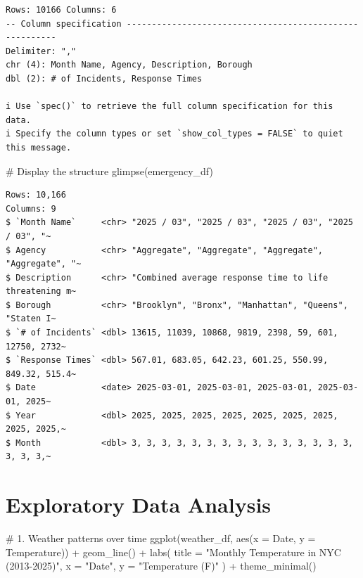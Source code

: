 \documentclass[
  letterpaper,
  DIV=11,
  numbers=noendperiod]{scrreprt}
\newenvironment{Shaded}{\begin{snugshade}}{\end{snugshade}}
\newcommand{\AttributeTok}[1]{\textcolor[rgb]{0.40,0.45,0.13}{#1}}
\newcommand{\CommentTok}[1]{\textcolor[rgb]{0.37,0.37,0.37}{#1}}
\newcommand{\FunctionTok}[1]{\textcolor[rgb]{0.28,0.35,0.67}{#1}}
\newcommand{\NormalTok}[1]{\textcolor[rgb]{0.00,0.23,0.31}{#1}}
\newcommand{\SpecialCharTok}[1]{\textcolor[rgb]{0.37,0.37,0.37}{#1}}
\newcommand{\StringTok}[1]{\textcolor[rgb]{0.13,0.47,0.30}{#1}}
\begin{document}
\begin{verbatim}
Rows: 10166 Columns: 6
-- Column specification --------------------------------------------------------
Delimiter: ","
chr (4): Month Name, Agency, Description, Borough
dbl (2): # of Incidents, Response Times

i Use `spec()` to retrieve the full column specification for this data.
i Specify the column types or set `show_col_types = FALSE` to quiet this message.
\end{verbatim}

\begin{Shaded}
\begin{Highlighting}[]
\CommentTok{\# Display the structure}
\FunctionTok{glimpse}\NormalTok{(emergency\_df)}
\end{Highlighting}
\end{Shaded}

\begin{verbatim}
Rows: 10,166
Columns: 9
$ `Month Name`     <chr> "2025 / 03", "2025 / 03", "2025 / 03", "2025 / 03", "~
$ Agency           <chr> "Aggregate", "Aggregate", "Aggregate", "Aggregate", "~
$ Description      <chr> "Combined average response time to life threatening m~
$ Borough          <chr> "Brooklyn", "Bronx", "Manhattan", "Queens", "Staten I~
$ `# of Incidents` <dbl> 13615, 11039, 10868, 9819, 2398, 59, 601, 12750, 2732~
$ `Response Times` <dbl> 567.01, 683.05, 642.23, 601.25, 550.99, 849.32, 515.4~
$ Date             <date> 2025-03-01, 2025-03-01, 2025-03-01, 2025-03-01, 2025~
$ Year             <dbl> 2025, 2025, 2025, 2025, 2025, 2025, 2025, 2025, 2025,~
$ Month            <dbl> 3, 3, 3, 3, 3, 3, 3, 3, 3, 3, 3, 3, 3, 3, 3, 3, 3, 3,~
\end{verbatim}

\section{Exploratory Data Analysis}\label{exploratory-data-analysis}

\begin{Shaded}
\begin{Highlighting}[]
\CommentTok{\# 1. Weather patterns over time}
\FunctionTok{ggplot}\NormalTok{(weather\_df, }\FunctionTok{aes}\NormalTok{(}\AttributeTok{x =}\NormalTok{ Date, }\AttributeTok{y =}\NormalTok{ Temperature)) }\SpecialCharTok{+}
  \FunctionTok{geom\_line}\NormalTok{() }\SpecialCharTok{+}
  \FunctionTok{labs}\NormalTok{(}
    \AttributeTok{title =} \StringTok{"Monthly Temperature in NYC (2013{-}2025)"}\NormalTok{,}
    \AttributeTok{x =} \StringTok{"Date"}\NormalTok{,}
    \AttributeTok{y =} \StringTok{"Temperature (F)"}
\NormalTok{  ) }\SpecialCharTok{+}
  \FunctionTok{theme\_minimal}\NormalTok{()}
\end{Highlighting}
\end{Shaded}
\end{document}
